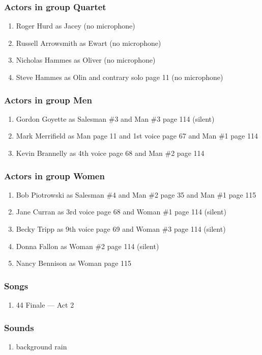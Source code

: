 \subsubsection{Actors in group Quartet}
\begin{enumerate}
\item Roger Hurd as Jacey (no microphone)
\item Russell Arrowsmith as Ewart (no microphone)
\item Nicholas Hammes as Oliver (no microphone)
\item Steve Hammes as Olin and contrary solo page 11 (no microphone)
\end{enumerate}
\subsubsection{Actors in group Men}
\begin{enumerate}
\item Gordon Goyette as Salesman \#3 and Man \#3 page 114 (silent)
\item Mark Merrifield as Man page 11 and 1st voice page 67 and Man \#1 page 114
\item Kevin Brannelly as 4th voice page 68 and Man \#2 page 114
\end{enumerate}
\subsubsection{Actors in group Women}
\begin{enumerate}
\item Bob Piotrowski as Salesman \#4 and Man \#2 page 35 and Man \#1 page 115
\item Jane Curran as 3rd voice page 68 and Woman \#1 page 114 (silent)
\item Becky Tripp as 9th voice page 69 and Woman \#3 page 114 (silent)
\item Donna Fallon as Woman \#2 page 114 (silent)
\item Nancy Bennison as Woman page 115
\end{enumerate}

\subsubsection{Songs}
\begin{enumerate}
\item 44 Finale --- Act 2
\end{enumerate}\subsubsection{Sounds}
\begin{enumerate}
\item background rain
\end{enumerate}
